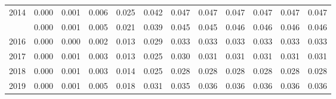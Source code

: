 \documentclass[
]{article}
\begin{document}
\begin{longtable}[t]{lrrrrrrrrrrr}
2014 & 0.000 & 0.001 & 0.006 & 0.025 & 0.042 & 0.047 & 0.047 & 0.047 & 0.047 & 0.047 & 0.047\\
\addlinespace
2015 & 0.000 & 0.001 & 0.005 & 0.021 & 0.039 & 0.045 & 0.045 & 0.046 & 0.046 & 0.046 & 0.046\\
2016 & 0.000 & 0.000 & 0.002 & 0.013 & 0.029 & 0.033 & 0.033 & 0.033 & 0.033 & 0.033 & 0.033\\
2017 & 0.000 & 0.001 & 0.003 & 0.013 & 0.025 & 0.030 & 0.031 & 0.031 & 0.031 & 0.031 & 0.031\\
2018 & 0.000 & 0.001 & 0.003 & 0.014 & 0.025 & 0.028 & 0.028 & 0.028 & 0.028 & 0.028 & 0.028\\
2019 & 0.000 & 0.001 & 0.005 & 0.018 & 0.031 & 0.035 & 0.036 & 0.036 & 0.036 & 0.036 & 0.036\\*
\end{longtable}
\end{document}
